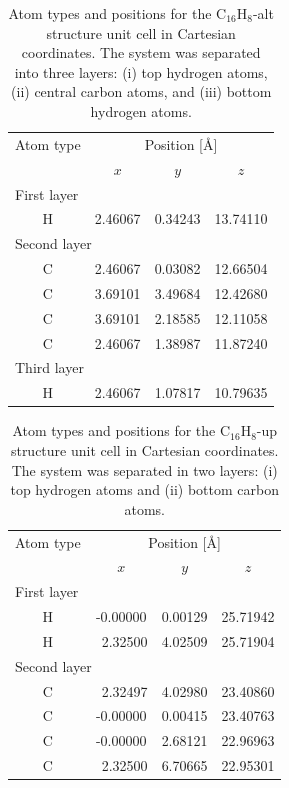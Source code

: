 \documentclass[pss]{wiley2sp} %
\begin{document}
\begin{table}[t]
\centering
\begin{tabular}{cccc}
\hline
\hline
Atom type &  \multicolumn{3}{c}{Position [\AA] } \\
\cline{2-4}
& $x$ & $y$ & $z$ \\
\hline
\multicolumn{2}{l}{First layer}\\
H & 2.46067 & 0.34243 & 13.74110 \\
\multicolumn{2}{l}{Second layer}\\
C & 2.46067 & 0.03082 & 12.66504 \\
C & 3.69101 & 3.49684 & 12.42680 \\
C & 3.69101 & 2.18585 & 12.11058 \\
C & 2.46067 & 1.38987 & 11.87240 \\
\multicolumn{2}{l}{Third layer}\\
H & 2.46067 & 1.07817 & 10.79635 \\
\hline
\hline
\end{tabular}
\caption[]{%
Atom types and positions for the C$_{16}$H$_{8}$-alt structure unit cell in
Cartesian coordinates. The system was separated into three layers: (i) top
hydrogen atoms, (ii) central carbon atoms, and (iii) bottom hydrogen atoms.
\label{tab:altstrc}}
\end{table}
\begin{table}[t]
\centering
\begin{tabular}{cccc}
\hline
\hline
Atom type &  \multicolumn{3}{c}{Position [\AA]} \\
\cline{2-4}
& $x$ & $y$ & $z$ \\
\hline
\multicolumn{2}{l}{First layer}\\
H &  -0.00000 & 0.00129 & 25.71942 \\
H & \ 2.32500 & 4.02509 & 25.71904 \\
\multicolumn{2}{l}{Second layer}\\
C & \ 2.32497 & 4.02980 & 23.40860 \\
C &  -0.00000 & 0.00415 & 23.40763 \\
C &  -0.00000 & 2.68121 & 22.96963 \\
C & \ 2.32500 & 6.70665 & 22.95301 \\
\hline
\hline
\end{tabular}
\caption[]{%
Atom types and positions for the C$_{16}$H$_{8}$-up structure unit cell in
Cartesian coordinates. The system was separated in two layers: (i) top
hydrogen atoms and (ii) bottom carbon atoms.}
\label{tab:upstrc}
\end{table}
\end{document}

